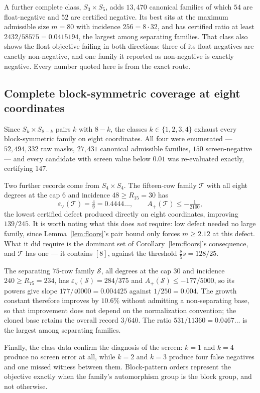 \documentclass[11pt]{article}
\theoremstyle{remark}
\newcommand{\eps}{\varepsilon}
\begin{document}
A further complete class, $S_3\times S_5$, adds $13{,}470$ canonical families of
which $54$ are float-negative and $52$ are certified negative.  Its best sits at
the maximum admissible size $m=80$ with incidence $256=8\cdot32$, and has
certified ratio at least $2432/58575=0.0415194$, the largest among separating
families.  That class also shows the float objective failing in both directions:
three of its float negatives are exactly non-negative, and one family it reported
as non-negative is exactly negative.  Every number quoted here is from the exact
route.

\subsection{Complete block-symmetric coverage at eight coordinates}

Since $S_k\times S_{8-k}$ pairs $k$ with $8-k$, the classes $k\in\{1,2,3,4\}$
exhaust every block-symmetric family on eight coordinates.  All four were
enumerated --- $52{,}494{,}332$ raw masks, $27{,}431$ canonical admissible
families, $150$ screen-negative --- and every candidate with screen value below
$0.01$ was re-evaluated exactly, certifying $147$.

Two further records come from $S_4\times S_4$.  The fifteen-row family
$\mathcal T$ with all eight degrees at the cap $6$ and incidence
$48\ge R_{15}=30$ has
\[
  \eps_\vee(\mathcal T)=\tfrac49=0.4444\ldots,\qquad
  A_+(\mathcal T)\le-\tfrac1{2100},
\]
the lowest certified defect produced directly on eight coordinates, improving
\(139/245\).  It is
worth noting what this does \emph{not} require: low defect needed no large
family, since Lemma~\ref{lem:floors}'s pair bound only forces $m\ge2.12$ at this
defect.  What it did require is the dominant set of Corollary~\ref{lem:floors}'s
consequence, and $\mathcal T$ has one --- it contains $[8]$, against the
threshold $\tfrac85\bar s=128/25$.

The separating $75$-row family $\mathcal S$, all degrees at the cap $30$ and
incidence $240\ge R_{75}=234$, has $\eps_\vee(\mathcal S)=284/375$ and
$A_+(\mathcal S)\le-177/5000$, so its powers give slope
$177/40000=0.004425$ against $1/250=0.004$.  The growth constant therefore
improves by $10.6\%$ without admitting a non-separating base, so that
improvement does not depend on the normalization convention; the cloned base
retains the overall record $3/640$.  The ratio $531/11360=0.0467\ldots$ is the
largest among separating families.

Finally, the class data confirm the diagnosis of the screen: $k=1$ and $k=4$
produce no screen error at all, while $k=2$ and $k=3$ produce four false
negatives and one missed witness between them.  Block-pattern orders represent
the objective exactly when the family's automorphism group is the block group,
and not otherwise.
\end{document}
